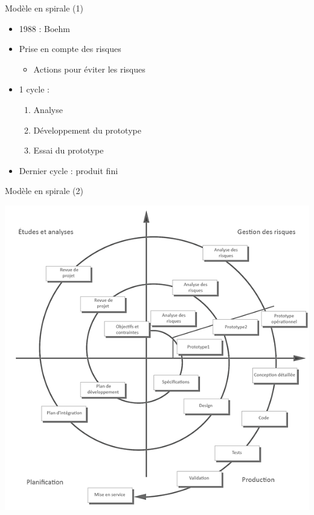 \documentclass[14pt]{beamer}
\begin{document}
\begin{framentitle}{Modèle en spirale (1)}
    \begin{itemize}
        \item 1988 : Boehm
        \item Prise en compte des risques
            \begin{itemize}
                \item Actions pour éviter les risques
            \end{itemize}
        \item 1 cycle :
            \begin{enumerate}
                \item Analyse
                \item Développement du prototype
                \item Essai du prototype
            \end{enumerate}
        \item Dernier cycle : produit fini
    \end{itemize}
\end{framentitle}

\begin{framentitle}{Modèle en spirale (2)}
    \begin{center}
        \includegraphics[width=.7\textwidth]{fig7.png}
    \end{center}
\end{framentitle}
\end{document}
